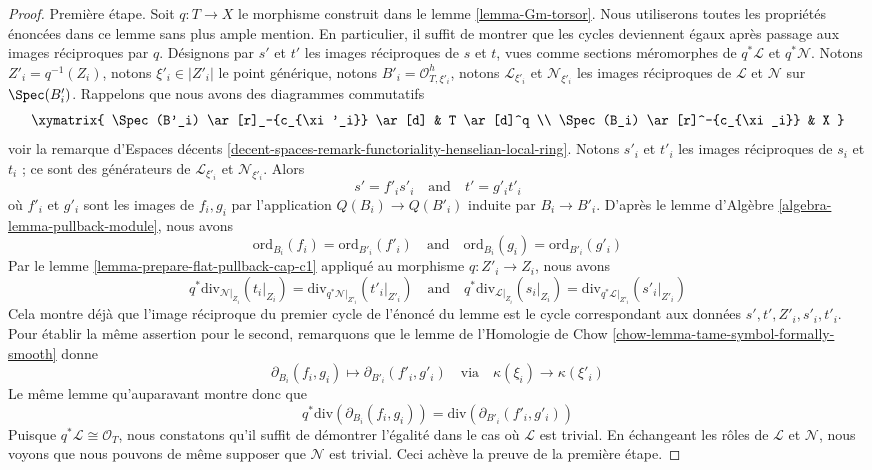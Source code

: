 \begin{proof}
\medskip\noindent
Première étape. Soit $q : T \to X$ le morphisme construit dans le lemme
\ref{lemma-Gm-torsor}. Nous utiliserons toutes les propriétés énoncées dans ce
lemme sans plus ample mention. En particulier, il suffit de montrer que les cycles
deviennent égaux après passage aux images réciproques par $q$. Désignons par $s'$ et $t'$ les images réciproques de $s$ et
$t$, vues comme sections méromorphes de $q^*\mathcal{L}$ et $q^*\mathcal{N}$.
Notons $Z'_i = q^{-1}(Z_i)$, notons $\xi'_i \in |Z'_i|$ le point générique,
notons $B'_i = \mathcal{O}_{T, \xi'_i}^h$, notons $\mathcal{L}_{\xi'_i}$ et
$\mathcal{N}_{\xi'_i}$ les images réciproques de $\mathcal{L}$ et $\mathcal{N}$ sur
$\Spec(B'_i)$. Rappelons que nous avons des diagrammes commutatifs
$$
\xymatrix{
\Spec(B'_i) \ar[r]_-{c_{\xi'_i}} \ar[d] & T \ar[d]^q \\
\Spec(B_i) \ar[r]^-{c_{\xi_i}} & X
}
$$
voir la remarque d'Espaces décents
\ref{decent-spaces-remark-functoriality-henselian-local-ring}. Notons $s'_i$
et $t'_i$ les images réciproques de $s_i$ et $t_i$ ; ce sont des générateurs de
$\mathcal{L}_{\xi'_i}$ et $\mathcal{N}_{\xi'_i}$. Alors
$$
s' = f'_i s'_i
\quad\text{and}\quad
t' = g'_i t'_i
$$
où $f'_i$ et $g'_i$ sont les images de $f_i, g_i$ par l'application $Q(B_i) \to
Q(B'_i)$ induite par $B_i \to B'_i$. D'après le lemme d'Algèbre
\ref{algebra-lemma-pullback-module}, nous avons
$$
\text{ord}_{B_i}(f_i) = \text{ord}_{B'_i}(f'_i)
\quad\text{and}\quad
\text{ord}_{B_i}(g_i) = \text{ord}_{B'_i}(g'_i)
$$
Par le lemme \ref{lemma-prepare-flat-pullback-cap-c1} appliqué au morphisme $q : Z'_i \to
Z_i$, nous avons
$$
q^*\text{div}_{\mathcal{N}|_{Z_i}}(t_i|_{Z_i}) =
\text{div}_{q^*\mathcal{N}|_{Z'_i}}(t'_i|_{Z'_i})
\quad\text{and}\quad
q^*\text{div}_{\mathcal{L}|_{Z_i}}(s_i|_{Z_i}) =
\text{div}_{q^*\mathcal{L}|_{Z'_i}}(s'_i|_{Z'_i})
$$
Cela montre déjà que l'image réciproque du premier cycle de l'énoncé du lemme
est le cycle correspondant aux données $s', t', Z'_i, s'_i, t'_i$. Pour établir
la même assertion pour le second, remarquons que le lemme de l'Homologie de Chow
\ref{chow-lemma-tame-symbol-formally-smooth} donne
$$
\partial_{B_i}(f_i, g_i) \mapsto
\partial_{B'_i}(f'_i, g'_i)
\quad\text{via}\quad
\kappa(\xi_i) \to \kappa(\xi'_i)
$$
Le même lemme qu'auparavant montre donc que
$$
q^*\text{div}(\partial_{B_i}(f_i, g_i)) =
\text{div}(\partial_{B'_i}(f'_i, g'_i))
$$
Puisque $q^*\mathcal{L} \cong \mathcal{O}_T$, nous constatons qu'il suffit de
démontrer l'égalité dans le cas où $\mathcal{L}$ est trivial. En échangeant les
rôles de $\mathcal{L}$ et $\mathcal{N}$, nous voyons que nous pouvons de même
supposer que $\mathcal{N}$ est trivial. Ceci achève la preuve de la
première étape.


\end{proof}
